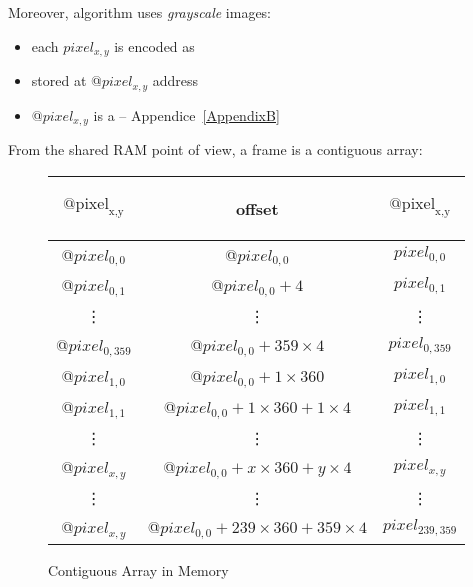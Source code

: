 Moreover,  algorithm uses \emph{grayscale} images:

\begin{itemize}
	\item each $pixel_{x,y}$ is encoded as 
	\item stored at @$pixel_{x,y}$ address
	\item @$pixel_{x,y}$ is a  -- Appendice~\ref{AppendixB}
\end{itemize}


From the shared RAM point of view, a frame is a contiguous array:
\begin{figure}[h]
\begin{center}
\begin{tabular}{|c|c|c|}

	\hline
	\begin{bf}$\text{@pixel}_\text{{x,y}}$\end{bf} & \begin{bf}offset\end{bf} & \begin{bf}$\text{@pixel}_\text{{x,y}}$\end{bf} \\[10pt]

	\hline
	@$pixel_{0,0}$ & @$pixel_{0,0}$ & $pixel_{0,0}$ \\

	\hline
	@$pixel_{0,1}$ & @$pixel_{0,0} + 4$ & $pixel_{0,1}$ \\

	\hline
	\vdots & \vdots & \vdots \\

	\hline
	@$pixel_{0,359}$ & @$pixel_{0,0} + 359\times 4$ & $pixel_{0,359}$ \\

	\hline
	@$pixel_{1,0}$ & @$pixel_{0,0} + 1\times 360$ & $pixel_{1,0}$ \\

	\hline
	@$pixel_{1,1}$ & @$pixel_{0,0} + 1\times 360 + 1\times 4$ & $pixel_{1,1}$ \\

	\hline
	\vdots & \vdots & \vdots \\

	\hline
	\rowcolor{yellow}@$pixel_{x,y}$ & @$pixel_{0,0} + x\times 360 + y\times 4$ & $pixel_{x,y}$ \\

	\hline
	\vdots & \vdots & \vdots \\

	\hline
	@$pixel_{x,y}$ & @$pixel_{0,0} + 239\times 360 + 359\times 4$ & $pixel_{239,359}$ \\

	\hline

\end{tabular}
\end{center}
\caption{Contiguous Array in Memory}
\end{figure}
\FloatBarrier

